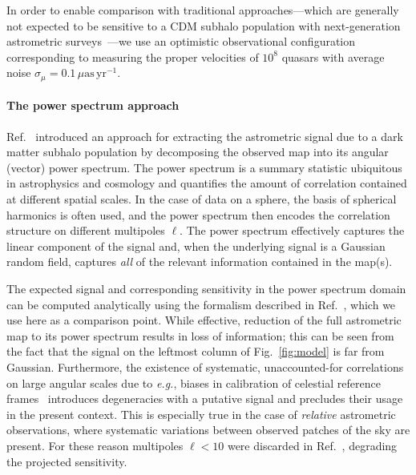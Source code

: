 \documentclass[]{article}
\begin{document}
In order to enable comparison with traditional approaches---which are generally not expected to be sensitive to a CDM subhalo population with next-generation astrometric surveys~\cite{VanTilburg:2018ykj,Mishra-Sharma:2020ynk}---we use an optimistic observational configuration corresponding to measuring the proper velocities of $10^8$ quasars with average noise $\sigma_{\mu} = 0.1\,\mu\mathrm{as}\,\mathrm{yr}^{-1}$.

\paragraph{The power spectrum approach} Ref.~\cite{Mishra-Sharma:2020ynk} introduced an approach for extracting the astrometric signal due to a dark matter subhalo population by decomposing the observed map into its angular (vector) power spectrum. The power spectrum is a summary statistic ubiquitous in astrophysics and cosmology and quantifies the amount of correlation contained at different spatial scales. In the case of data on a sphere, the basis of spherical harmonics is often used, and the power spectrum then encodes the correlation structure on different multipoles $\ell$. The power spectrum effectively captures the linear component of the signal and, when the underlying signal is a Gaussian random field, captures \emph{all} of the relevant information contained in the map(s).


The expected signal and corresponding sensitivity in the power spectrum domain can be computed analytically using the formalism described in Ref.~\cite{Mishra-Sharma:2020ynk}, which we use here as a comparison point. While effective, reduction of the full astrometric map to its power spectrum results in loss of information; this can be seen from the fact that the signal on the leftmost column of Fig.~\ref{fig:model} is far from Gaussian. Furthermore, the existence of systematic, unaccounted-for correlations on large angular scales due to \emph{e.g.}, biases in calibration of celestial reference frames~\cite{2018A&A...616A..14G} introduces degeneracies with a putative signal and precludes their usage in the present context. This is especially true in the case of \emph{relative} astrometric observations, where systematic variations between observed patches of the sky are present. For these reason multipoles $\ell < 10$ were discarded in Ref.~\cite{Mishra-Sharma:2020ynk}, degrading the projected sensitivity.
\end{document}
